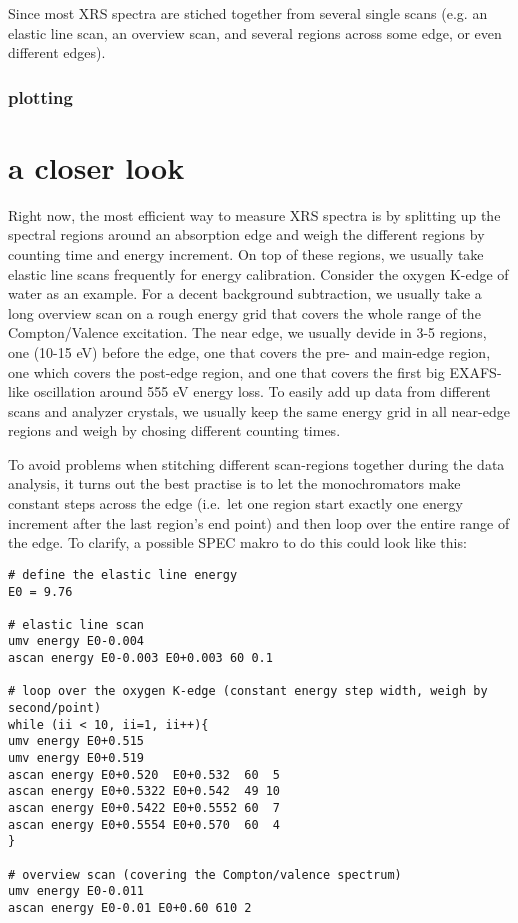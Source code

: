 \documentclass[aps,prl,groupedaddress]{revtex4}
\begin{document}
Since most XRS spectra are stiched together from several single scans (e.g. an elastic line scan, an overview scan, and several regions across some edge, or even different edges).


\subsubsection{plotting}


\section{a closer look}

Right now, the most efficient way to measure XRS spectra is by splitting up the spectral regions around an absorption edge and weigh the different regions by counting time and energy increment. On top of these regions, we usually take elastic line scans frequently for energy calibration. Consider the oxygen K-edge of water as an example. For a decent background subtraction, we usually take a long overview scan on a rough energy grid that covers the whole range of the Compton/Valence excitation. The near edge, we usually devide in 3-5 regions, one (10-15 eV) before the edge, one that covers the pre- and main-edge region, one which covers the post-edge region, and one that covers the first big EXAFS-like oscillation around 555 eV energy loss. To easily add up data from different scans and analyzer crystals, we usually keep the same energy grid in all near-edge regions and weigh by chosing different counting times. 

To avoid problems when stitching different scan-regions together during the data analysis, it turns out the best practise is to let the monochromators make constant steps across the edge (i.e.~let one region start exactly one energy increment after the last region's end point) and then loop over the entire range of the edge. To clarify, a possible SPEC makro to do this could look like this: 

\lstset{language=bash}
\begin{lstlisting}[frame=single]
# define the elastic line energy
E0 = 9.76

# elastic line scan
umv energy E0-0.004
ascan energy E0-0.003 E0+0.003 60 0.1

# loop over the oxygen K-edge (constant energy step width, weigh by second/point)
while (ii < 10, ii=1, ii++){
umv energy E0+0.515
umv energy E0+0.519
ascan energy E0+0.520  E0+0.532  60  5
ascan energy E0+0.5322 E0+0.542  49 10
ascan energy E0+0.5422 E0+0.5552 60  7
ascan energy E0+0.5554 E0+0.570  60  4
}

# overview scan (covering the Compton/valence spectrum)
umv energy E0-0.011
ascan energy E0-0.01 E0+0.60 610 2
\end{lstlisting}
\end{document}
